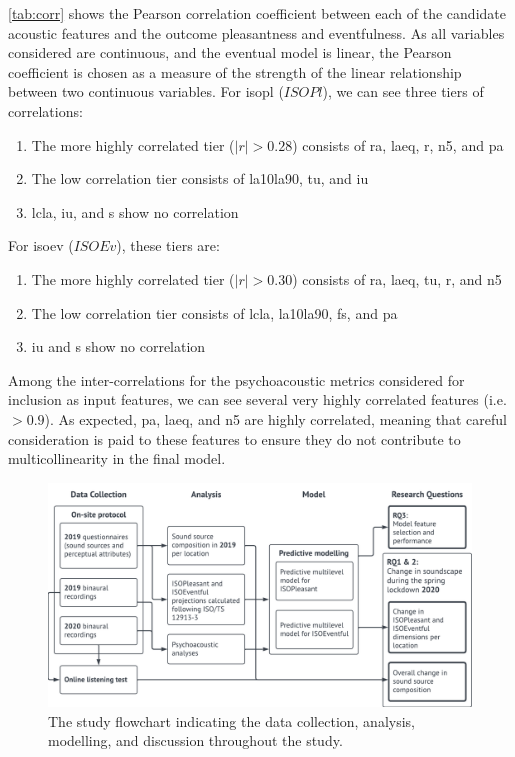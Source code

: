    \cref{tab:corr} shows the Pearson correlation coefficient between each of the candidate acoustic features and the outcome pleasantness and eventfulness. As all variables considered are continuous, and the eventual model is linear, the Pearson coefficient is chosen as a measure of the strength of the linear relationship between two continuous variables. For \gls{isopl} ($ISOPl$), we can see three tiers of correlations:

   \begin{enumerate}
     \item The more highly correlated tier ($|r| > 0.28$) consists of \gls{ra}, \gls{laeq}, \gls{r}, \gls{n5}, and \gls{pa}
     \item The low correlation tier consists of \gls{la10la90}, \gls{tu}, and \gls{iu}
     \item \gls{lcla}, \gls{iu}, and \gls{s} show no correlation
   \end{enumerate}

   For \gls{isoev} ($ISOEv$), these tiers are:
   \begin{enumerate}
     \item The more highly correlated tier ($|r| > 0.30$) consists of \gls{ra}, \gls{laeq}, \gls{tu}, \gls{r}, and \gls{n5}
     \item The low correlation tier consists of \gls{lcla}, \gls{la10la90}, \gls{fs}, and \gls{pa}
     \item \gls{iu} and \gls{s} show no correlation
   \end{enumerate}

   Among the inter-correlations for the psychoacoustic metrics considered for inclusion as input features, we can see several very highly correlated features (i.e. $>0.9$). As expected, \gls{pa}, \gls{laeq}, and \gls{n5} are highly correlated, meaning that careful consideration is paid to these features to ensure they do not contribute to multicollinearity in the final model.


   \begin{figure}[h]
     \centering
     \includegraphics[width=\textwidth]{Figures/Lockdown-Fig1.png}
     \caption{The study flowchart indicating the data collection, analysis, modelling, and discussion throughout the study. \label{fig:lockdown-study-framework}}
   \end{figure}

